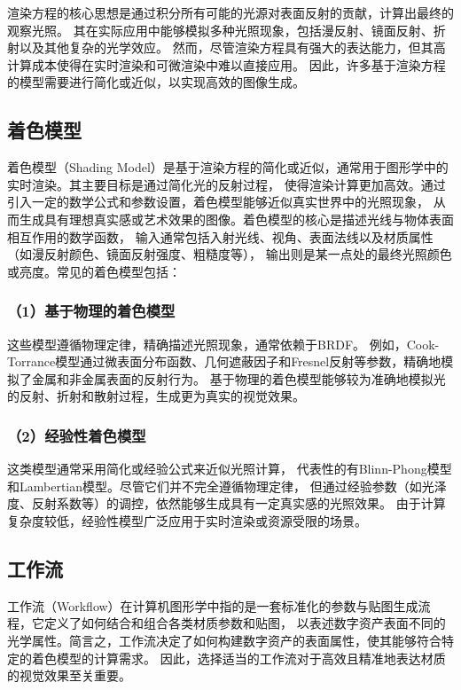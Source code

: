 渲染方程的核心思想是通过积分所有可能的光源对表面反射的贡献，计算出最终的观察光照。
其在实际应用中能够模拟多种光照现象，包括漫反射、镜面反射、折射以及其他复杂的光学效应。
然而，尽管渲染方程具有强大的表达能力，但其高计算成本使得在实时渲染和可微渲染中难以直接应用。
因此，许多基于渲染方程的模型需要进行简化或近似，以实现高效的图像生成。

\subsection{着色模型}

着色模型（Shading Model）是基于渲染方程的简化或近似，通常用于图形学中的实时渲染。其主要目标是通过简化光的反射过程，
使得渲染计算更加高效。通过引入一定的数学公式和参数设置，着色模型能够近似真实世界中的光照现象，
从而生成具有理想真实感或艺术效果的图像。着色模型的核心是描述光线与物体表面相互作用的数学函数，
输入通常包括入射光线、视角、表面法线以及材质属性（如漫反射颜色、镜面反射强度、粗糙度等），
输出则是某一点处的最终光照颜色或亮度。常见的着色模型包括：

\subsubsection*{（1）基于物理的着色模型}

这些模型遵循物理定律，精确描述光照现象，通常依赖于BRDF。
例如，Cook-Torrance模型\cite{Cook_1981}通过微表面分布函数、几何遮蔽因子和Fresnel反射等参数，精确地模拟了金属和非金属表面的反射行为。
基于物理的着色模型能够较为准确地模拟光的反射、折射和散射过程，生成更为真实的视觉效果。

\subsubsection*{（2）经验性着色模型}

这类模型通常采用简化或经验公式来近似光照计算，
代表性的有Blinn-Phong模型和Lambertian模型。尽管它们并不完全遵循物理定律，
但通过经验参数（如光泽度、反射系数等）的调控，依然能够生成具有一定真实感的光照效果。
由于计算复杂度较低，经验性模型广泛应用于实时渲染或资源受限的场景。

\subsection{工作流} \label{sec:workflow}
工作流（Workflow）在计算机图形学中指的是一套标准化的参数与贴图生成流程，它定义了如何结合和组合各类材质参数和贴图，
以表述数字资产表面不同的光学属性。简言之，工作流决定了如何构建数字资产的表面属性，使其能够符合特定的着色模型的计算需求。
因此，选择适当的工作流对于高效且精准地表达材质的视觉效果至关重要。

